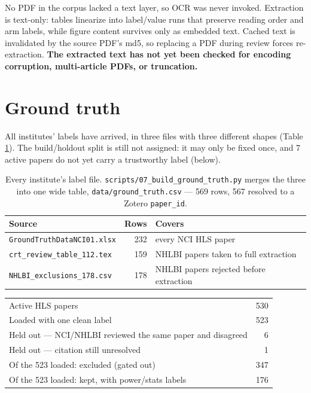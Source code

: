 \documentclass[11pt]{article}
\begin{document}
No PDF in the corpus lacked a text layer, so OCR was never invoked. Extraction is text-only: tables
linearize into label/value runs that preserve reading order and arm labels, while figure content survives
only as embedded text. Cached text is invalidated by the source PDF's md5, so replacing a PDF during
review forces re-extraction. \textbf{The extracted text has not yet been checked for encoding corruption,
multi-article PDFs, or truncation.}

\section{Ground truth}

All institutes' labels have arrived, in three files with three different shapes (Table
\ref{tab:gt-sources}). The build/holdout split is still not assigned: it may only be fixed once, and
7 active papers do not yet carry a trustworthy label (below).

\begin{table}[h]
\centering
\begin{tabular}{lrl}
\toprule
\textbf{Source} & \textbf{Rows} & \textbf{Covers} \\
\midrule
\texttt{GroundTruthDataNCI01.xlsx} & 232 & every NCI HLS paper \\
\texttt{crt\_review\_table\_112.tex} & 159 & NHLBI papers taken to full extraction \\
\texttt{NHLBI\_exclusions\_178.csv} & 178 & NHLBI papers rejected before extraction \\
\bottomrule
\end{tabular}
\caption{Every institute's label file. \texttt{scripts/07\_build\_ground\_truth.py} merges the three
into one wide table, \texttt{data/ground\_truth.csv} --- 569 rows, 567 resolved to a Zotero
\texttt{paper\_id}.}
\label{tab:gt-sources}
\end{table}

\begin{table}[h]
\centering
\begin{tabular}{lr}
\toprule
Active HLS papers & 530 \\
\quad Loaded with one clean label & 523 \\
\quad Held out --- NCI/NHLBI reviewed the same paper and disagreed & 6 \\
\quad Held out --- citation still unresolved & 1 \\
\midrule
Of the 523 loaded: excluded (gated out) & 347 \\
Of the 523 loaded: kept, with power/stats labels & 176 \\
\bottomrule
\end{tabular}
\end{table}
\end{document}
